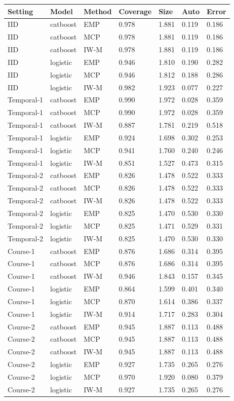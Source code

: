 \begin{tabular}{lllllll}
\toprule
Setting & Model & Method & Coverage & Size & Auto & Error\\
\midrule
IID & catboost & EMP & 0.978 & 1.881 & 0.119 & 0.186\\
IID & catboost & MCP & 0.978 & 1.881 & 0.119 & 0.186\\
IID & catboost & IW-M & 0.978 & 1.881 & 0.119 & 0.186\\
IID & logistic & EMP & 0.946 & 1.810 & 0.190 & 0.282\\
IID & logistic & MCP & 0.946 & 1.812 & 0.188 & 0.286\\
IID & logistic & IW-M & 0.982 & 1.923 & 0.077 & 0.227\\
Temporal-1 & catboost & EMP & 0.990 & 1.972 & 0.028 & 0.359\\
Temporal-1 & catboost & MCP & 0.990 & 1.972 & 0.028 & 0.359\\
Temporal-1 & catboost & IW-M & 0.887 & 1.781 & 0.219 & 0.518\\
Temporal-1 & logistic & EMP & 0.924 & 1.698 & 0.302 & 0.253\\
Temporal-1 & logistic & MCP & 0.941 & 1.760 & 0.240 & 0.246\\
Temporal-1 & logistic & IW-M & 0.851 & 1.527 & 0.473 & 0.315\\
Temporal-2 & catboost & EMP & 0.826 & 1.478 & 0.522 & 0.333\\
Temporal-2 & catboost & MCP & 0.826 & 1.478 & 0.522 & 0.333\\
Temporal-2 & catboost & IW-M & 0.826 & 1.478 & 0.522 & 0.333\\
Temporal-2 & logistic & EMP & 0.825 & 1.470 & 0.530 & 0.330\\
Temporal-2 & logistic & MCP & 0.825 & 1.471 & 0.529 & 0.331\\
Temporal-2 & logistic & IW-M & 0.825 & 1.470 & 0.530 & 0.330\\
Course-1 & catboost & EMP & 0.876 & 1.686 & 0.314 & 0.395\\
Course-1 & catboost & MCP & 0.876 & 1.686 & 0.314 & 0.395\\
Course-1 & catboost & IW-M & 0.946 & 1.843 & 0.157 & 0.345\\
Course-1 & logistic & EMP & 0.864 & 1.599 & 0.401 & 0.340\\
Course-1 & logistic & MCP & 0.870 & 1.614 & 0.386 & 0.337\\
Course-1 & logistic & IW-M & 0.914 & 1.717 & 0.283 & 0.304\\
Course-2 & catboost & EMP & 0.945 & 1.887 & 0.113 & 0.488\\
Course-2 & catboost & MCP & 0.945 & 1.887 & 0.113 & 0.488\\
Course-2 & catboost & IW-M & 0.945 & 1.887 & 0.113 & 0.488\\
Course-2 & logistic & EMP & 0.927 & 1.735 & 0.265 & 0.276\\
Course-2 & logistic & MCP & 0.970 & 1.920 & 0.080 & 0.379\\
Course-2 & logistic & IW-M & 0.927 & 1.735 & 0.265 & 0.276\\
\bottomrule
\end{tabular}